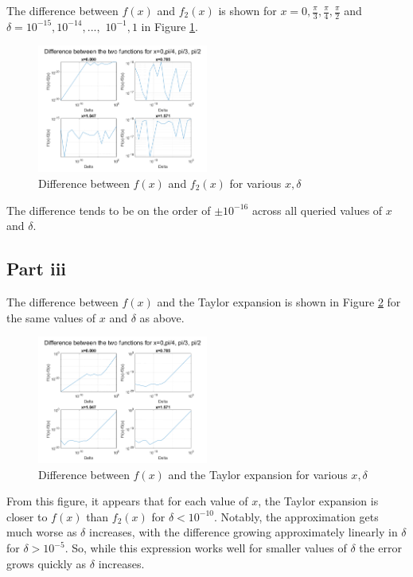 \documentclass[12pt]{exam}
\begin{document}
The difference between $f(x)$ and $f_2(x)$ is shown for $x=0,\frac{\pi}{3}, \frac{\pi}{4}, \frac{\pi}{2}$ and $\delta = 10^{-15}, 10^{-14},...,$ $10^{-1}, 1$ in Figure \ref{fig:fminusf2}.

\begin{figure}[h!]
\centering
\includegraphics[width=0.5\textwidth]{q3p2.png}
\caption{Difference between $f(x)$ and $f_2(x)$ for various $x,\delta$}\label{fig:fminusf2}
\end{figure}
The difference tends to be on the order of $\pm 10^{-16}$ across all queried values of $x$ and $\delta$. 

\subsection*{Part iii}

The difference between $f(x)$ and the Taylor expansion is shown in Figure \ref{fig:fminusTaylor} for the same values of $x$ and $\delta$ as above. 
\begin{figure}[h!]
\centering
\includegraphics[width=0.5\textwidth]{q3p3.png}
\caption{Difference between $f(x)$ and the Taylor expansion for various $x,\delta$}\label{fig:fminusTaylor}
\end{figure}

From this figure, it appears that for each value of $x$, the Taylor expansion is closer to $f(x)$ than $f_2(x)$ for $\delta <10^{-10}$. Notably, the approximation gets much worse as $\delta$ increases, with the difference growing approximately linearly in $\delta$ for $\delta > 10^{-5}$. So, while this expression works well for smaller values of $\delta$ the error grows quickly as $\delta$ increases.
\end{document}
